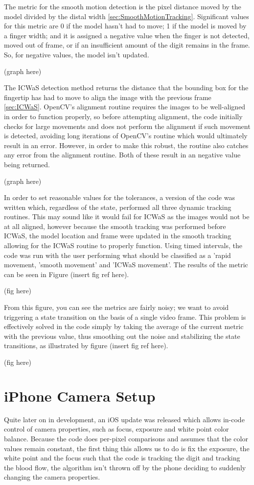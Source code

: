 The metric for the smooth motion detection is the pixel distance moved by the model divided by the distal width \ref{sec:SmoothMotionTracking}. Significant values for this metric are 0 if the model hasn't had to move; 1 if the model is moved by a finger width; and it is assigned a negative value when the finger is not detected, moved out of frame, or if an insufficient amount of the digit remains in the frame. So, for negative values, the model isn't updated.

(graph here)

The ICWaS detection method returns the distance that the bounding box for the fingertip has had to move to align the image with the previous frame \ref{sec:ICWaS}. OpenCV's alignment routine requires the images to be well-aligned in order to function properly, so before attempting alignment, the code initially checks for large movements and does not perform the alignment if such movement is detected, avoiding long iterations of OpenCV's routine which would ultimately result in an error. However, in order to make this robust, the routine also catches any error from the alignment routine. Both of these result in an negative value being returned.

(graph here)

In order to set reasonable values for the tolerances, a version of the code was written which, regardless of the state, performed all three dynamic tracking routines. This may sound like it would fail for ICWaS as the images would not be at all aligned, however because the smooth tracking was performed before ICWaS, the model location and frame were updated in the smooth tracking allowing for the ICWaS routine to properly function. Using timed intervals, the code was run with the user performing what should be classified as a 'rapid movement, 'smooth movement' and 'ICWaS movement'. The results of the metric can be seen in Figure (insert fig ref here).

(fig here)

From this figure, you can see the metrics are fairly noisy; we want to avoid triggering a state transition on the basis of a single video frame. This problem is effectively solved in the code simply by taking the average of the current metric with the previous value, thus smoothing out the noise and stabilizing the state transitions, as illustrated by figure (insert fig ref here).

(fig here)

\section{iPhone Camera Setup}\label{sec:iPhoneCameraSetup}
Quite later on in development, an iOS update was released which allows in-code control of camera properties, such as focus, exposure and white point color balance. Because the code does per-pixel comparisons and assumes that the color values remain constant, the first thing this allows us to do is fix the exposure, the white point and the focus such that the code is tracking the digit and tracking the blood flow, the algorithm isn't thrown off by the phone deciding to suddenly changing the camera properties. 

